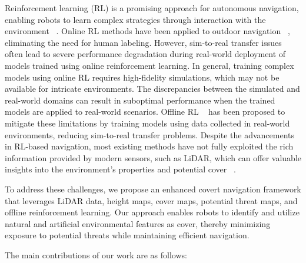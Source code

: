 Reinforcement learning (RL) is a promising approach for autonomous navigation, enabling robots to learn complex strategies through interaction with the environment ~\cite{rl1, rl2}. Online RL methods have been applied to outdoor navigation ~\cite{online1, online2}, eliminating the need for human labeling. However, sim-to-real transfer issues ~\cite{sim2real1, sim2real2, weerakoon2022sim} often lead to severe performance degradation during real-world deployment of models trained using online reinforcement learning. In general, training complex models using online RL requires high-fidelity simulations, which may not be available for intricate environments. The discrepancies between the simulated and real-world domains can result in suboptimal performance when the trained models are applied to real-world scenarios. Offline RL ~\cite{offline1, offline2} has been proposed to mitigate these limitations by training models using data collected in real-world environments, reducing sim-to-real transfer problems. Despite the advancements in RL-based navigation, most existing methods have not fully exploited the rich information provided by modern sensors, such as LiDAR, which can offer valuable insights into the environment's properties and potential cover ~\cite{lidar1, lidar2}. 


To address these challenges, we propose an enhanced covert navigation framework that leverages LiDAR data, height maps, cover maps, potential threat maps, and offline reinforcement learning. Our approach enables robots to identify and utilize natural and artificial environmental features as cover, thereby minimizing exposure to potential threats while maintaining efficient navigation.


The main contributions of our work are as follows:

